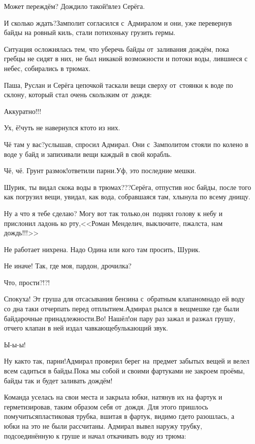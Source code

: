 \diagdash Может переждём? Дождило такой!\mdash влез Серёга.

\diagdash И сколько ждать?\mdash Замполит согласился с~Адмиралом и они, уже перевернув байды на ровный киль, стали потихоньку грузить гермы. 

Ситуация осложнялась тем, что уберечь байды от~заливания дождём, пока гребцы не сидят в них, не был никакой возможности и потоки воды, лившиеся с небес, собирались в трюмах.

Паша, Руслан и Серёга цепочкой таскали вещи сверху от~стоянки к воде по склону, который стал очень скользким от~дождя:

\diagdash Аккуратно!!!

\diagdash Ух, ё!\mdash чуть не навернулся кто\sdash то из них.

\diagdash Чё там у вас?\mdash услышав, спросил Адмирал. Они с~Замполитом стояли по колено в воде у байд и запихивали вещи каждый в свой корабль.

\diagdash Чё, чё. Грунт размок!\mdash ответили парни.\mdash Уф, это последние мешки.

\diagdash Шурик, ты видал скока воды в трюмах???\mdash Серёга, отпустив нос байды, после того как погрузил вещи, увидал, как вода, собравшаяся там, хлынула по всему днищу.

\diagdash Ну а что я тебе сделаю? Могу вот так только,\mdash он~поднял голову к небу и прислонил ладонь ко рту,\mdash <<Роман Менделич, выключите, п\sdash жалста, нам дождь!!!>>

\diagdash Не работает нихрена. Надо Одина или кого там просить, Шурик.

\diagdash Не иначе! Так, где моя, пардон, дрочилка?

\diagdash Что, прости?!?!

\diagdash Спокуха! Эт груша для отсасывания бензина с~обратным клапаном\mdash надо ей воду со дна таки отчерпать перед отплытием.\mdash Адмирал рылся в вещмешке где были байдарочные принадлежности.\mdash Во! Нашёл!\mdash он пару раз зажал и разжал грушу, отчего клапан в ней издал чавкающе\sdash булькающий звук.

\diagdash Ы-ы-ы! 

\diagdash Ну как\sdash то так, парни!\mdash Адмирал проверил берег на~предмет забытых вещей и велел всем садиться в байды.\mdash Пока мы собой и своими фартуками не закроем проёмы, байды так и будет заливать дождём!

Команда уселась на свои места и закрыла юбки, натянув их на фартук и герметизировав, таким образом себя от~дождя. Для этого пришлось помучиться\mdash пластиковая трубка, вшитая в фартук, видимо где\sdash то разошлась, а юбки на это не были рассчитаны. Адмирал вывел наружу трубку, подсоединённую к груше и начал откачивать воду из трюма:

